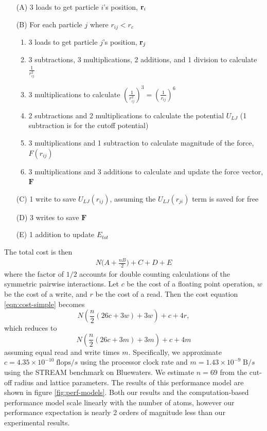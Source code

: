 \documentclass[12pt]{article}
\renewcommand{\v}[1]{\bold{#1}}
\begin{document}
\begin{itemize}
\item[(A)] 3 loads to get particle $i$'s position, $\v{r}_i$
\item[(B)] For each particle $j$ where $r_{ij}<r_c$
  \begin{enumerate}
    \item 3 loads to get particle $j$'s position, $\v{r}_j$
    \item 3 subtractions, 3 multiplications, 2 additions, and 1 division to calculate $\frac{1}{r_{ij}^2}$ 
    \item 3 multiplications to calculate $\left(\frac{1}{r_{ij}^2}\right)^3 = \left(\frac{1}{r_{ij}}\right)^6$
    \item 2 subtractions and 2 multiplications to calculate the potential $U_{LJ}$  
             (1 subtraction is for the cutoff potential)
    \item 3 multiplications and 1 subtraction to calculate magnitude of the force, $F(r_{ij})$
    \item 3 multiplications and 3 additions to calculate and update the force vector, $\textbf{F}$
  \end{enumerate}
\item[(C)] 1 write to save $U_{LJ}(r_{ij})$, assuming the $U_{LJ}(r_{ji})$ term is saved for free
\item[(D)] 3 writes to save $\textbf{F}$
\item[(E)] 1 addition to update $E_{tot}$
\end{itemize}
The total cost is then
\begin{align}
  N\bigg(A+\frac{nB}{2}\bigg)+C+D+E
  \label{eqn:cost-simple}
\end{align}
where the factor of $1/2$ accounts for double counting calculations of
the symmetric pairwise interactions. Let $c$ be the cost of a floating
point operation, $w$ be the cost of a write, and $r$ be the cost of a
read. Then the cost equation \ref{eqn:cost-simple} becomes
\begin{equation}
    N \left(\frac{n}{2} \left(26 c + 3 w\right) + 3 w\right) + c + 4 r,
\end{equation}
which reduces to
\begin{equation}
  N \left(\frac{n}{2} \left(26 c + 3 m\right) + 3 m\right) + c + 4 m
  \label{eqn:perf-model}
\end{equation}
assuming equal read and write times $m$. Specifically, we approximate
$c = 4.35\times10^{-10}\;\text{flops}/s$ using the processor clock
rate and $m = 1.43\times10^{-9}\;\text{B}/s$ using the STREAM
benchmark on Bluewaters. We estimate $n = 69$ from the cut-off radius
and lattice parameters. The results of this performance model are
shown in figure \ref{fig:perf-models}. Both our results and the
computation-based performance model scale linearly with the number of
atoms, however our performance expectation is nearly 2 orders of
magnitude less than our experimental results.
\end{document}
